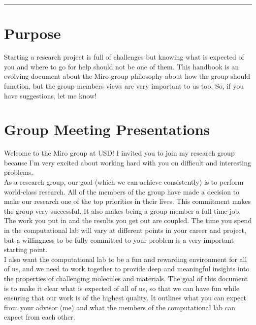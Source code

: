 \documentclass[letterpaper]{article}
\begin{document}

\noindent\rule{16.5cm}{1.5pt}


\section{Purpose}
Starting a research project is full of challenges but knowing what is expected of you and where to go for help should not be one of them. This handbook is an evolving document about the Miro group philosophy about how the group should function, but the group members views are very important to us too. So, if you have suggestions, let me know!

\section{Group Meeting Presentations}
Welcome to the Miro group at USD!  I invited you to join my research group because I'm very excited about working hard with you on difficult and interesting problems.\\

As a research group, our goal (which we can achieve consistently) is to perform world-class research. All of the members of the group have made a decision to make our research one of the top priorities in their lives. This commitment makes the group very successful. It also makes being a group member a full time job. The work you put in and the results you get out are coupled. The time you spend in the computational lab will vary at different points in your career and project, but a willingness to be fully committed to your problem is a very important starting point.\\

I also want the computational lab to be a fun and rewarding environment for all of us, and we need to work together to provide deep and meaningful insights into the properties of challenging molecules and materials. The goal of this document is to make it clear what is expected of all of us, so that we can have fun while ensuring that our work is of the highest quality. It outlines what you can expect from your advisor (me) and what the members of the computational lab can expect from each other.\\
\end{document}
